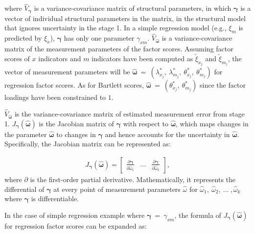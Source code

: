 \documentclass[
  man]{apa6}
\begin{document}
where \(\hat{V}_{\boldsymbol{\gamma}}\) is a variance-covariance matrix of structural parameters, in which \(\boldsymbol{\gamma}\) is a vector of individual structural parameters in the matrix, in the structural model that ignores uncertainty in the stage 1. In a simple regression model (e.g., \(\xi_{m}\) is predicted by \(\xi_{x}\)), \(\boldsymbol{\gamma}\) has only one parameter \(\gamma_{xm}\). \(\hat{V}_{\boldsymbol{\hat{\omega}}}\) is a variance-covariance matrix of the measurement parameters of the factor scores. Assuming factor scores of \(x\) indicators and \(m\) indicators have been computed as \(\tilde{\xi}_{x_{j}}\) and \(\tilde{\xi}_{m_{j}}\), the vector of measurement parameters will be \(\boldsymbol{\hat{\omega}} \ = \ (\lambda_{x_{j}}^\text{*}, \ \lambda_{m_{j}}^\text{*}, \ \theta_{x_{j}}^\text{*}, \ \theta_{m_{j}}^\text{*})\) for regression factor scores. As for Bartlett scores, \(\boldsymbol{\hat{\omega}} \ = \ (\theta_{x_{j}}^\text{*}, \ \theta_{m_{j}}^\text{*})\) since the factor loadings have been constrained to \(1\).

\(\hat{V}_{\boldsymbol{\hat{\omega}}}\) is the variance-covariance matrix of estimated measurement error from stage 1. \(J_{\boldsymbol{\gamma}}(\boldsymbol{\hat{\omega}})\) is the Jacobian matrix of \(\boldsymbol{\gamma}\) with respect to \(\boldsymbol{\hat{\omega}}\), which maps changes in the parameter \(\boldsymbol{\hat{\omega}}\) to changes in \(\boldsymbol{\gamma}\) and hence accounts for the uncertainty in \(\boldsymbol{\hat{\omega}}\). Specifically, the Jacobian matrix can be represented as:

\begin{align}
J_{\boldsymbol{\gamma}}(\boldsymbol{\hat{\omega}}) = 
\begin{bmatrix}
\frac{\partial \boldsymbol{\gamma}}{\partial \hat{\omega}_{1}} &...& \frac{\partial \boldsymbol{\gamma}}{\partial \hat{\omega}_{k}}
\end{bmatrix},
\end{align}
where \(\partial\) is the first-order partial derivative. Mathematically, it represents the differential of \(\boldsymbol{\gamma}\) at every point of measurement parameters \(\hat{\omega}\) for \(\hat{\omega}_{1}, \ \hat{\omega}_{2}, \ ... \ ,\hat{\omega}_{k}\) where \(\boldsymbol{\gamma}\) is differentiable.

In the case of simple regression example where \(\boldsymbol{\gamma} \ = \ \gamma_{xm}\), the formula of \(J_{\boldsymbol{\gamma}}(\boldsymbol{\hat{\omega}})\) for regression factor scores can be expanded as:
\end{document}
